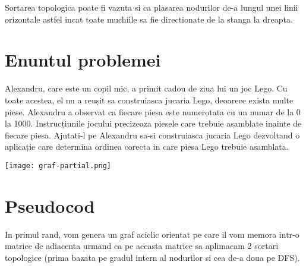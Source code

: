 \documentclass[14pt]{article}
\begin{document}
\vspace{10 mm}

Sortarea topologica poate fi vazuta si ca plasarea nodurilor de-a lungul unei linii orizontale astfel incat toate muchiile sa fie directionate de la stanga la dreapta. 

\newpage
\section*{Enuntul problemei}
Alexandru, care este un copil mic, a primit cadou de ziua lui un joc Lego. Cu toate acestea, el nu a reușit sa construiasca jucaria Lego, deoarece exista multe piese. Alexandru a observat ca fiecare piesa este numerotata cu un numar de la 0 la 1000. Instrucțiunile jocului precizeaza piesele care trebuie asamblate inainte de fiecare piesa. Ajutati-l pe Alexandru sa-si construiasca jucaria Lego dezvoltand o aplicație care determina ordinea corecta in care piesa Lego trebuie asamblata.
\vspace{25 mm}
\begin{center}\texttt{[image: graf-partial.png]}
\end{center}



\newpage
\section*{Pseudocod}
In primul rand, vom genera un graf aciclic orientat pe care il vom memora intr-o matrice de adiacenta urmand ca pe aceasta matrice sa aplimacam 2 sortari topologice (prima bazata pe gradul intern al nodurilor si cea de-a doua pe DFS).
\end{document}
